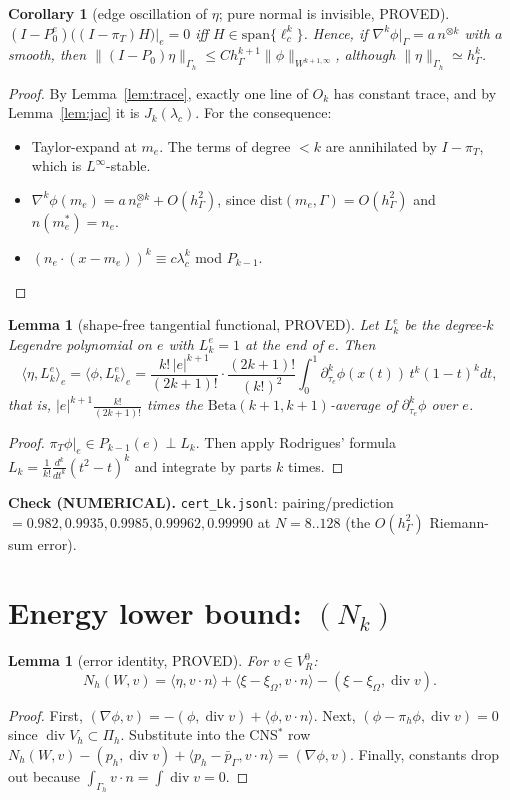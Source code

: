 \documentclass[11pt]{article}
\newtheorem{lemma}[theorem]{Lemma}
\newtheorem{corollary}[theorem]{Corollary}
\theoremstyle{remark}
\newcommand{\hG}{h_\Gamma}
\newcommand{\Gh}{\Gamma_h}
\newcommand{\ip}[2]{\langle #1,#2\rangle}
\begin{document}
\begin{corollary}[edge oscillation of $\eta$; pure normal is invisible, PROVED]\label{cor:osc}
$(I-P_0^{e})\big((I-\pi_T)H\big)|_e=0$ iff $H\in\mathrm{span}\{\ell_c^k\}$. Hence, if $\nabla^k\phi|_\Gamma=a\,n^{\otimes k}$
with $a$ smooth, then $\|(I-P_0)\eta\|_{\Gh}\le C\hG^{k+1}\|\phi\|_{W^{k+1,\infty}}$, although $\|\eta\|_{\Gh}\simeq\hG^k$.
\end{corollary}
\begin{proof}
By Lemma~\ref{lem:trace}, exactly one line of $O_k$ has constant trace, and by Lemma~\ref{lem:jac} it is $J_k(\lambda_c)$.
For the consequence:
\begin{itemize}
\item Taylor-expand at $m_e$. The terms of degree $<k$ are annihilated by $I-\pi_T$, which is $L^\infty$-stable.
\item $\nabla^k\phi(m_e)=a\,n_e^{\otimes k}+O(\hG^2)$, since $\mathrm{dist}(m_e,\Gamma)=O(\hG^2)$ and $n(m_e^\ast)=n_e$.
\item $(n_e\cdot(x-m_e))^k\equiv c\lambda_c^k$ mod $P_{k-1}$.\qedhere
\end{itemize}
\end{proof}

\begin{lemma}[shape-free tangential functional, PROVED]\label{lem:Lk}
Let $L_k^e$ be the degree-$k$ Legendre polynomial on $e$ with $L_k^e=1$ at the end of $e$. Then
\[
\ip{\eta}{L_k^e}_e=\ip{\phi}{L_k^e}_e=\frac{k!\,|e|^{k+1}}{(2k+1)!}\cdot\frac{(2k+1)!}{(k!)^2}\int_0^1\partial^k_{\tau_e}\phi(x(t))\,t^k(1-t)^kdt ,
\]
that is, $|e|^{k+1}\tfrac{k!}{(2k+1)!}$ times the $\mathrm{Beta}(k+1,k+1)$-average of $\partial^k_{\tau_e}\phi$ over $e$.
\end{lemma}
\begin{proof}
$\pi_T\phi|_e\in P_{k-1}(e)\perp L_k$. Then apply Rodrigues' formula $L_k=\frac1{k!}\frac{d^k}{dt^k}(t^2-t)^k$ and integrate by
parts $k$ times.
\end{proof}

\noindent\textbf{Check (NUMERICAL).} \texttt{cert\_Lk.jsonl}: pairing/prediction $=0.982,0.9935,0.9985,0.99962,0.99990$ at
$N=8..128$ (the $O(\hG^2)$ Riemann-sum error).

\section{Energy lower bound: $(N_k)$}
\begin{lemma}[error identity, PROVED]\label{lem:id}
For $v\in V_R^0$:
\[
N_h(W,v)=\ip{\eta}{v\cdot n}+\ip{\xi-\xi_\Omega}{v\cdot n}-(\xi-\xi_\Omega,\operatorname{div}v).
\]
\end{lemma}
\begin{proof}
First, $(\nabla\phi,v)=-(\phi,\operatorname{div}v)+\ip{\phi}{v\cdot n}$. Next, $(\phi-\pi_h\phi,\operatorname{div}v)=0$ since
$\operatorname{div}V_h\subset\Pi_h$. Substitute into the CNS$^\ast$ row
$N_h(W,v)-(p_h,\operatorname{div}v)+\ip{p_h-\bar p_\Gamma}{v\cdot n}=(\nabla\phi,v)$. Finally, constants drop out because
$\int_{\Gh}v\cdot n=\int\operatorname{div}v=0$.
\end{proof}
\end{document}
